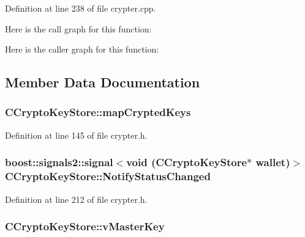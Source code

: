 Definition at line 238 of file crypter.\+cpp.



Here is the call graph for this function\+:




Here is the caller graph for this function\+:




\subsection{Member Data Documentation}
\hypertarget{class_c_crypto_key_store_ad1fb9b23eee7a352617209ee2e4f3498}{}
\subsubsection[{map\+Crypted\+Keys}]{ C\+Crypto\+Key\+Store\+::map\+Crypted\+Keys\hspace{0.3cm}{\ttfamily [protected]}}\label{class_c_crypto_key_store_ad1fb9b23eee7a352617209ee2e4f3498}


Definition at line 145 of file crypter.\+h.

\hypertarget{class_c_crypto_key_store_a251b9ed228a19ab39d542985b425fc85}{}
\subsubsection[{Notify\+Status\+Changed}]{\setlength{\rightskip}{0pt plus 5cm}boost\+::signals2\+::signal$<$void ({\bf C\+Crypto\+Key\+Store}$\ast$ wallet)$>$ C\+Crypto\+Key\+Store\+::\+Notify\+Status\+Changed}\label{class_c_crypto_key_store_a251b9ed228a19ab39d542985b425fc85}


Definition at line 212 of file crypter.\+h.

\hypertarget{class_c_crypto_key_store_ac74e458a90ce17a95e238bad724df3fd}{}
\subsubsection[{v\+Master\+Key}]{ C\+Crypto\+Key\+Store\+::v\+Master\+Key\hspace{0.3cm}{\ttfamily [protected]}}\label{class_c_crypto_key_store_ac74e458a90ce17a95e238bad724df3fd}



